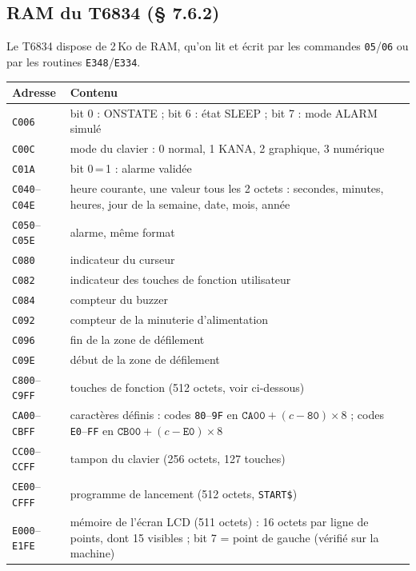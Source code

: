 \documentclass[a4paper,10pt]{article}
\newcommand{\hex}[1]{\texttt{#1}}
\begin{document}
\subsection{RAM du T6834 (§ 7.6.2)}
Le T6834 dispose de 2\,Ko de RAM, qu'on lit et écrit par les commandes
\hex{05}/\hex{06} ou par les routines \hex{E348}/\hex{E334}.

\begin{center}\small
\begin{tabular}{@{}l>{\raggedright\arraybackslash}p{11.5cm}@{}}
\toprule
Adresse & Contenu \\
\midrule
\hex{C006} & bit 0 : ONSTATE ; bit 6 : état SLEEP ; bit 7 : mode ALARM simulé \\
\hex{C00C} & mode du clavier : 0 normal, 1 KANA, 2 graphique, 3 numérique \\
\hex{C01A} & bit 0\,=\,1 : alarme validée \\
\hex{C040}--\hex{C04E} & heure courante, une valeur tous les 2 octets : secondes, minutes, heures, jour de la semaine, date, mois, année \\
\hex{C050}--\hex{C05E} & alarme, même format \\
\hex{C080} & indicateur du curseur \\
\hex{C082} & indicateur des touches de fonction utilisateur \\
\hex{C084} & compteur du buzzer \\
\hex{C092} & compteur de la minuterie d'alimentation \\
\hex{C096} & fin de la zone de défilement \\
\hex{C09E} & début de la zone de défilement \\
\hex{C800}--\hex{C9FF} & touches de fonction (512 octets, voir ci-dessous) \\
\hex{CA00}--\hex{CBFF} & caractères définis : codes \hex{80}--\hex{9F} en $\hex{CA00}+(c-\hex{80})\times 8$ ; codes \hex{E0}--\hex{FF} en $\hex{CB00}+(c-\hex{E0})\times 8$ \\
\hex{CC00}--\hex{CCFF} & tampon du clavier (256 octets, 127 touches) \\
\hex{CE00}--\hex{CFFF} & programme de lancement (512 octets, \texttt{START\$}) \\
\hex{E000}--\hex{E1FE} & mémoire de l'écran LCD (511 octets) : 16 octets par ligne de points, dont 15 visibles ; bit 7 = point de gauche (vérifié sur la machine) \\
\bottomrule
\end{tabular}
\end{center}
\end{document}
